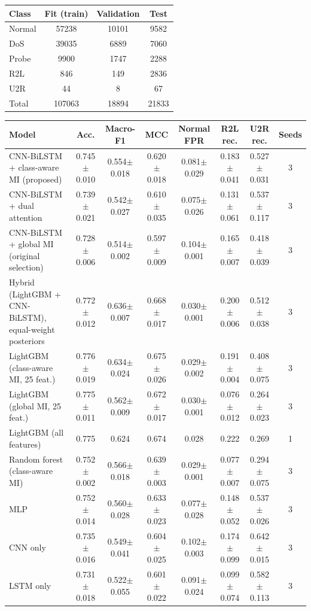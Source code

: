 \begin{tabular}{lccc}
\toprule
Class & Fit (train) & Validation & Test \\
\midrule
Normal & 57238 & 10101 & 9582 \\
DoS & 39035 & 6889 & 7060 \\
Probe & 9900 & 1747 & 2288 \\
R2L & 846 & 149 & 2836 \\
U2R & 44 & 8 & 67 \\
Total & 107063 & 18894 & 21833 \\
\bottomrule
\end{tabular}

\begin{tabular}{lccccccc}
\toprule
Model & Acc. & Macro-F1 & MCC & Normal FPR & R2L rec. & U2R rec. & Seeds \\
\midrule
CNN-BiLSTM + class-aware MI (proposed) & 0.745$\pm$0.010 & 0.554$\pm$0.018 & 0.620$\pm$0.018 & 0.081$\pm$0.029 & 0.183$\pm$0.041 & 0.527$\pm$0.031 & 3 \\
CNN-BiLSTM + dual attention & 0.739$\pm$0.021 & 0.542$\pm$0.027 & 0.610$\pm$0.035 & 0.075$\pm$0.026 & 0.131$\pm$0.061 & 0.537$\pm$0.117 & 3 \\
CNN-BiLSTM + global MI (original selection) & 0.728$\pm$0.006 & 0.514$\pm$0.002 & 0.597$\pm$0.009 & 0.104$\pm$0.001 & 0.165$\pm$0.007 & 0.418$\pm$0.039 & 3 \\
Hybrid (LightGBM + CNN-BiLSTM), equal-weight posteriors & 0.772$\pm$0.012 & 0.636$\pm$0.007 & 0.668$\pm$0.017 & 0.030$\pm$0.001 & 0.200$\pm$0.006 & 0.512$\pm$0.038 & 3 \\
LightGBM (class-aware MI, 25 feat.) & 0.776$\pm$0.019 & 0.634$\pm$0.024 & 0.675$\pm$0.026 & 0.029$\pm$0.002 & 0.191$\pm$0.004 & 0.408$\pm$0.075 & 3 \\
LightGBM (global MI, 25 feat.) & 0.775$\pm$0.011 & 0.562$\pm$0.009 & 0.672$\pm$0.017 & 0.030$\pm$0.001 & 0.076$\pm$0.012 & 0.264$\pm$0.023 & 3 \\
LightGBM (all features) & 0.775 & 0.624 & 0.674 & 0.028 & 0.222 & 0.269 & 1 \\
Random forest (class-aware MI) & 0.752$\pm$0.002 & 0.566$\pm$0.018 & 0.639$\pm$0.003 & 0.029$\pm$0.001 & 0.077$\pm$0.007 & 0.294$\pm$0.075 & 3 \\
MLP & 0.752$\pm$0.014 & 0.560$\pm$0.028 & 0.633$\pm$0.023 & 0.077$\pm$0.028 & 0.148$\pm$0.052 & 0.537$\pm$0.026 & 3 \\
CNN only & 0.735$\pm$0.016 & 0.549$\pm$0.041 & 0.604$\pm$0.025 & 0.102$\pm$0.003 & 0.174$\pm$0.099 & 0.642$\pm$0.015 & 3 \\
LSTM only & 0.731$\pm$0.018 & 0.522$\pm$0.055 & 0.601$\pm$0.022 & 0.091$\pm$0.024 & 0.099$\pm$0.074 & 0.582$\pm$0.113 & 3 \\
\bottomrule
\end{tabular}

